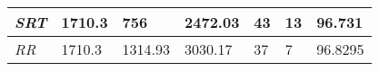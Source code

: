 \documentclass{article}
\begin{document}
\begin{table}[]
\begin{tabular}{|l|l|l|l|l|l|l|}
  \textit{SRT}       & 1710.3                                                                           & 756                                                                         & 2472.03                                                                            & 43                                                                                    & 13                                                                                  & 96.731                                                                     \\ \hline
  \textit{RR}        & 1710.3                                                                           & 1314.93                                                                     & 3030.17                                                                            & 37                                                                                    & 7                                                                                   & 96.8295                                                                    \\ \hline
  \end{tabular}
  \label{table:14}
\end{table}
\end{document}
